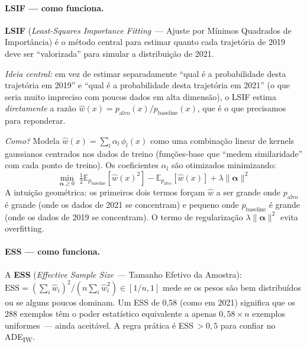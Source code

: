 \documentclass[11pt,a4paper]{article}
\begin{document}
\paragraph{LSIF --- como funciona.}
\textbf{LSIF} (\emph{Least-Squares Importance Fitting}~--- Ajuste por M\'inimos Quadrados de Import\^ancia) \cite{kliep,kanamori2009,sugiyama_book} \'e o m\'etodo central para estimar quanto cada trajet\'oria de 2019 deve ser ``valorizada'' para simular a distribui\c{c}\~ao de 2021.

\emph{Ideia central:} em vez de estimar separadamente ``qual \'e a probabilidade desta trajet\'oria em 2019'' e ``qual \'e a probabilidade desta trajet\'oria em 2021'' (o que seria muito impreciso com poucos dados em alta dimens\~ao), o LSIF estima \emph{diretamente} a raz\~ao $\hat{w}(x) = p_\text{alvo}(x)/p_\text{baseline}(x)$, que \'e o que precisamos para reponderar.

\emph{Como?} Modela $\hat{w}(x)\!=\!\sum_l\alpha_l\,\phi_l(x)$ como uma combina\c{c}\~ao linear de kernels gaussianos centrados nos dados de treino (fun\c{c}\~oes-base que ``medem similaridade'' com cada ponto de treino). Os coeficientes $\alpha_l$ s\~ao otimizados minimizando:
\[
\min_{\boldsymbol\alpha\geq 0}\;
\tfrac{1}{2}\mathbb{E}_{p_\text{baseline}}[\hat{w}(x)^2] -
\mathbb{E}_{p_\text{alvo}}[\hat{w}(x)] + \lambda\|\boldsymbol\alpha\|^2
\]
A intui\c{c}\~ao geom\'etrica: os primeiros dois termos for\c{c}am $\hat{w}$ a ser grande onde $p_\text{alvo}$ \'e grande (onde os dados de 2021 se concentram) e pequeno onde $p_\text{baseline}$ \'e grande (onde os dados de 2019 se concentram). O termo de regulariza\c{c}\~ao $\lambda\|\boldsymbol\alpha\|^2$ evita overfitting.

\paragraph{ESS --- como funciona.}
A \textbf{ESS} (\emph{Effective Sample Size}~--- Tamanho Efetivo da Amostra):
$\mathrm{ESS}\!=\!(\sum_i \hat{w}_i)^2/(n\sum_i \hat{w}_i^2) \in [1/n, 1]$
mede se os pesos s\~ao bem distribu\'idos ou se alguns poucos dominam. Um ESS de 0{,}58 (como em 2021) significa que os 288 exemplos t\^em o poder estat\'istico equivalente a apenas $0{,}58 \times n$ exemplos uniformes~--- ainda aceit\'avel. A regra pr\'atica \cite{sugiyama_book} \'e ESS\,$>\!0{,}5$ para confiar no ADE\textsubscript{IW}.
\end{document}
